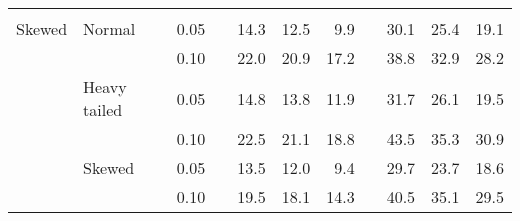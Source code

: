 \begin{table}[ht]
\begin{scriptsize}
\begin{center}
\begin{tabular}{ll p{.1cm} c p{.1cm} rrr p{.1cm} rrr}
&&&&&&&&&&&\\
Skewed       & Normal       && 0.05 &&   14.3 & 12.5 & 9.9 &   & 30.1 & 25.4 & 19.1 \\ 
             &              && 0.10 &&   22.0 & 20.9 & 17.2 &   & 38.8 & 32.9 & 28.2 \\ 
             & Heavy tailed && 0.05 &&   14.8 & 13.8 & 11.9 &   & 31.7 & 26.1 & 19.5 \\ 
             &              && 0.10 &&   22.5 & 21.1 & 18.8 &   & 43.5 & 35.3 & 30.9 \\ 
             & Skewed       && 0.05 &&   13.5 & 12.0 & 9.4 &   & 29.7 & 23.7 & 18.6 \\ 
             &              && 0.10 &&   19.5 & 18.1 & 14.3 &   & 40.5 & 35.1 & 29.5 \\ 


\end{tabular}
\end{center}
\end{scriptsize}
\end{table}
